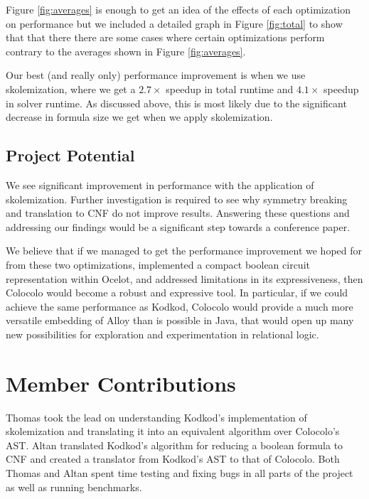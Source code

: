 \documentclass[10pt]{article}
\theoremstyle{definition}
\begin{document}

    Figure \ref{fig:averages} is enough to get an idea of the effects of each optimization on performance but we included a detailed graph in Figure \ref{fig:total} to show that that there there are some cases where certain optimizations perform contrary to the averages shown in Figure \ref{fig:averages}.

    Our best (and really only) performance improvement is when we use skolemization, where we get a $2.7\times$ speedup in total runtime and $4.1\times$ speedup in solver runtime. As discussed above, this is most likely due to the significant decrease in formula size we get when we apply skolemization.

    \subsection{Project Potential}

    We see significant improvement in performance with the application of skolemization. Further investigation is required to see why symmetry breaking and translation to CNF do not improve results. Answering these questions and addressing our findings would be a significant step towards a conference paper.

    We believe that if we managed to get the performance improvement we hoped for from these two optimizations, implemented a compact boolean circuit representation within Ocelot, and addressed limitations in its expressiveness, then Colocolo would become a robust and expressive tool. In particular, if we could achieve the same performance as Kodkod, Colocolo would provide a much more versatile embedding of Alloy than is possible in Java, that would open up many new possibilities for exploration and experimentation in relational logic.

  \section{Member Contributions}

  Thomas took the lead on understanding Kodkod's implementation of skolemization and translating it into an equivalent algorithm over Colocolo's AST. Altan translated Kodkod's algorithm for reducing a boolean formula to CNF and created a translator from Kodkod's AST to that of Colocolo. Both Thomas and Altan spent time testing and fixing bugs in all parts of the project as well as running benchmarks.
\end{document}
